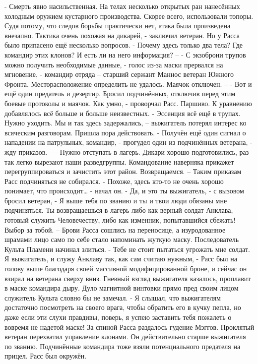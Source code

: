 \documentclass[a4paper, 12pt]{report}
\begin{document}
	- Смерть явно насильственная. На телах несколько открытых ран нанесённых холодным оружием кустарного производства. Скорее всего, использовали топоры. Судя потому, что следов борьбы практически нет, атака была произведена внезапно. Тактика очень похожая на дикарей, - заключил ветеран. Но у Расса было припасено ещё несколько вопросов.
	- Почему здесь только два тела? Где командир этих клонов? И есть ли на него информация? –
	- С экзоброни трупов можно получить необходимые данные, - голос из-за маски прервался на мгновение, - командир отряда – старший сержант Маннос ветеран Южного Фронта. Месторасположение определить не удалось. Маячок отключен. –
	- Вот и ещё один предатель и дезертир. Бросил подчинённых, отключив перед этим боевые протоколы и маячок. Как умно, - проворчал Расс. 
Паршиво. К уравнению добавлялось всё больше и больше неизвестных.
 - Эссенция всё ещё в трупах. Нужно уходить. Мы и так здесь задержались, – выжигатель потерял интерес ко всяческим разговорам. Пришла пора действовать.
	- Получён ещё один сигнал о нападении на патрульных, командир, - прогудел один из подчинённых ветерана, - жду приказов. –
	- Нужно отступать в лагерь. Дикари хорошо подготовились, раз так легко вырезают наши разведгруппы. Командование наверняка прикажет перегруппироваться и зачистить этот район. Возвращаемся. –
	Таким приказам Расс подчиняться не собирался.
	- Похоже, здесь кто-то не очень хорошо понимает, что происходит… - начал он.
	- Да, и это ты выжигатель, - с вызовом бросил ветеран, - Я выше тебя по званию и ты и твои люди обязаны мне подчиняться. Ты возвращаешься в лагерь либо как верный солдат Анклава, готовый служить Человечеству, либо как изменник, попытавшийся сбежать! Выбор за тобой. –
	Брови Расса сошлись на переносице, а изуродованное шрамами лицо само по себе стало напоминать жуткую маску. Последователь Культа Пламени начинал злиться.
	- Тебе не стоит пытаться угрожать мне солдат. Я выжигатель, и служу Анклаву так, как сам считаю нужным, - Расс был на голову выше благодаря своей массивной модифицированной броне, и сейчас он взирал на ветерана сверху вниз. Гневный взгляд выжигателя казалось, проплавит в маске командира дыру. Дуло магнитной винтовки прямо пред своим лицом служитель Культа словно бы не замечал.
	- Я слышал, что выжигателям достаточно посмотреть на своего врага, чтобы обратить его в кучку пепла, но даже если эти слухи правдивы, поверь, я успею заставить тебя пожалеть о вовремя не надетой маске!
	За спиной Расса раздалось гудение Мэггов. Проклятый ветеран перехватил управление клонами. Он действительно старше выжигателя по званию. Подчинённые командира тоже взяли потенциального предателя на прицел. Расс был окружён.
\end{document}
